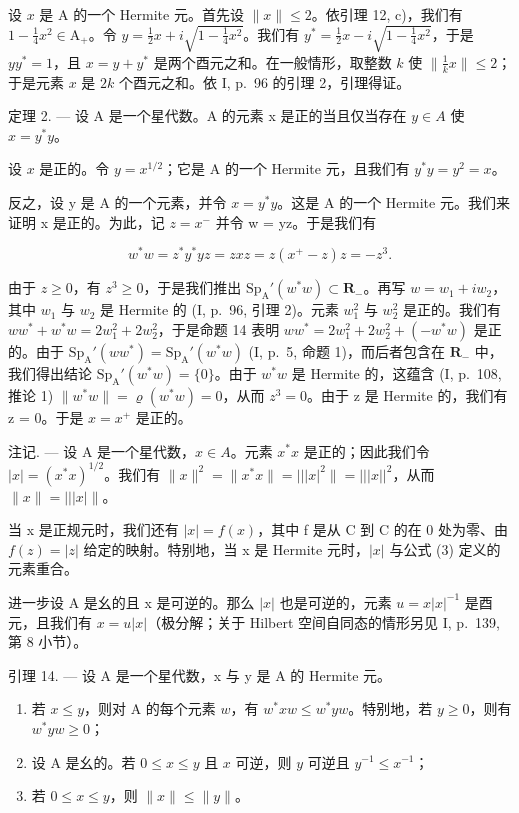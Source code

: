 设 \(x\) 是 A 的一个 Hermite 元。首先设 \(\| x \| \leqslant 2\)。依引理 12, c)，我们有 \(1 - \frac{1}{4} x^2 \in \mathrm{A}_+\)。令 \(y = \frac{1}{2} x + i\sqrt{1 - \frac{1}{4} x^2}\)。我们有 \(y^* = \frac{1}{2} x - i\sqrt{1 - \frac{1}{4} x^2}\)，于是 \(yy^* = 1\)，且 \(x = y + y^*\) 是两个酉元之和。在一般情形，取整数 \(k\) 使 \(\| \frac{1}{k} x \| \leqslant 2\)；于是元素 \(x\) 是 \(2k\) 个酉元之和。依 I, p.~96 的引理 2，引理得证。

定理 2. — 设 A 是一个星代数。A 的元素 x 是正的当且仅当存在 \(y \in A\) 使 \(x = y^{*}y\)。

设 \(x\) 是正的。令 \(y = x^{1/2}\)；它是 A 的一个 Hermite 元，且我们有 \(y^*y = y^2 = x\)。

反之，设 y 是 A 的一个元素，并令 \(x = y^{*}y\)。这是 A 的一个 Hermite 元。我们来证明 x 是正的。为此，记 \(z = x^{-}\) 并令 w = yz。于是我们有

\[
w ^ {*} w = z ^ {*} y ^ {*} y z = z x z = z (x ^ {+} - z) z = - z ^ {3}.
\]

由于 \(z \geqslant 0\)，有 \(z^3 \geqslant 0\)，于是我们推出 \(\mathrm{Sp}_{\mathrm{A}}'(w^{*}w) \subset \mathbf{R}_{-}\)。再写 \(w = w_1 + iw_2\)，其中 \(w_1\) 与 \(w_2\) 是 Hermite 的 (I, p.~96, 引理 2)。元素 \(w_1^2\) 与 \(w_2^2\) 是正的。我们有 \(ww^{*} + w^{*}w = 2w_{1}^{2} + 2w_{2}^{2}\)，于是命题 14 表明 \(ww^{*} = 2w_{1}^{2} + 2w_{2}^{2} + (-w^{*}w)\) 是正的。由于 \(\mathrm{Sp}_{\mathrm{A}}'(ww^{*}) = \mathrm{Sp}_{\mathrm{A}}'(w^{*}w)\) (I, p.~5, 命题 1)，而后者包含在 \(\mathbf{R}_{-}\) 中，我们得出结论 \(\mathrm{Sp}_{\mathrm{A}}'(w^{*}w) = \{0\}\)。由于 \(w^{*}w\) 是 Hermite 的，这蕴含 (I, p.~108, 推论 1) \(\|w^{*}w\| = \varrho(w^{*}w) = 0\)，从而 \(z^{3} = 0\)。由于 z 是 Hermite 的，我们有 z = 0。于是 \(x = x^{+}\) 是正的。

注记. --- 设 A 是一个星代数，\(x \in A\)。元素 \(x^{*}x\) 是正的；因此我们令 \(|x| = (x^{*}x)^{1/2}\)。我们有 \(\|x\|^{2} = \|x^{*}x\| = |||x|^{2}\| = |||x||^{2}\)，从而 \(\|x\| = |||x|\|\)。

当 x 是正规元时，我们还有 \(|x| = f(x)\)，其中 f 是从 C 到 C 的在 0 处为零、由 \(f(z) = |z|\) 给定的映射。特别地，当 x 是 Hermite 元时，\(|x|\) 与公式 (3) 定义的元素重合。

进一步设 A 是幺的且 x 是可逆的。那么 \(|x|\) 也是可逆的，元素 \(u = x|x|^{-1}\) 是酉元，且我们有 \(x = u|x|\)（极分解；关于 Hilbert 空间自同态的情形另见 I, p.~139, 第 8 小节）。

引理 14. --- 设 A 是一个星代数，x 与 y 是 A 的 Hermite 元。

\begin{enumerate}
\def\labelenumi{\alph{enumi})}
\item
  若 \(x \leqslant y\)，则对 A 的每个元素 \(w\)，有 \(w^{*}xw \leqslant w^{*}yw\)。特别地，若 \(y \geqslant 0\)，则有 \(w^{*}yw \geqslant 0\)；
\item
  设 A 是幺的。若 \(0 \leqslant x \leqslant y\) 且 \(x\) 可逆，则 \(y\) 可逆且 \(y^{-1} \leqslant x^{-1}\)；
\item
  若 \(0 \leqslant x \leqslant y\)，则 \(\|x\| \leqslant \|y\|\)。
\end{enumerate}


